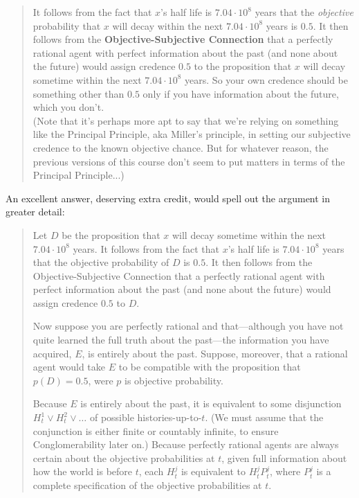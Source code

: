 \documentclass[12pt,letterpaper]{article}
\begin{document}
\begin{enumerate}
\begin{enumerate}
{\begin{quote}
It follows from the fact that $x$'s half life is $7.04 \cdot 10^8$ years that the \emph{objective} probability that $x$ will decay within the next $7.04 \cdot 10^8$ years is $0.5$. It then follows from the \textbf{Objective-Subjective Connection} that a perfectly rational agent with perfect information about the past (and none about the future) would assign credence $0.5$ to the proposition that $x$ will decay sometime within the next $7.04 \cdot 10^8$ years. So your own credence should be something other than $0.5$ only if you have information about the future, which you don't. \\ (Note that it's perhaps more apt to say that we're relying on something like the Principal Principle, aka Miller's principle, in setting our subjective credence to the known objective chance. But for whatever reason, the previous versions of this course don't seem to put matters in terms of the Principal Principle...)
\end{quote}
An excellent answer, deserving extra credit, would spell out the argument in greater detail:
\begin{quote}
Let  $D$ be the proposition that $x$ will decay sometime within the next $7.04 \cdot 10^8$ years.
It follows from the fact that $x$'s half life is $7.04 \cdot 10^8$ years that the {objective} probability of $D$ is $0.5$. It then follows from the Objective-Subjective Connection that a perfectly rational agent with perfect information about the past (and none about the future) would assign credence $0.5$ to $D$.

Now suppose you are perfectly rational and that---although you have not quite learned the full truth about the past---the information you have acquired, $E$, is entirely about the past. Suppose, moreover, that a rational agent would take $E$ to be compatible with the proposition that $p(D) = 0.5$, were $p$ is objective probability.


Because $E$ is entirely about the past, it is equivalent to some disjunction $H^1_t \vee H^2_t \vee \dots$ of possible histories-up-to-$t$. (We must assume that the conjunction is either finite or countably infinite, to ensure Conglomerability later on.) Because perfectly rational agents are always certain about the objective probabilities at $t$, given full information about how the world is before $t$, each $H_t^j$ is equivalent to $H_t^jP_t^j$, where $P_t^j$ is a complete specification of the objective probabilities at $t$. 


\end{quote}}
\end{enumerate}
\end{enumerate}
\end{document}
